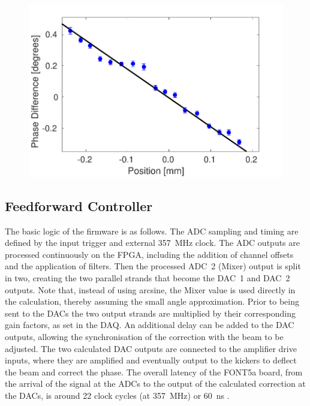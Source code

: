 \documentclass[%
 reprint,
 superscriptaddress,
 amsmath,
 amssymb,
 prstab,
]{revtex4-1}
\begin{document}

\begin{figure}
	\includegraphics[width=\columnwidth]{figs/hw/phMonHScan}%
	\caption{\label{f:phMonHScan}
	}
\end{figure}

\subsection{\label{ss:font}Feedforward Controller}

The basic logic of the firmware is as follows. The ADC sampling and timing are 
defined by the input trigger and external 357~MHz clock. The ADC outputs are 
processed continuously on the FPGA, including the addition of channel offsets 
and the application of filters. Then the processed ADC~2 (Mixer) output is 
split in two, creating the two parallel strands that become the DAC~1 and DAC~2 
outputs. Note that, instead of using arcsine, the Mixer value is used directly 
in the calculation, thereby assuming the small angle approximation. 
Prior to being sent to the DACs the two output strands are 
multiplied by their corresponding gain factors, as set in the DAQ. An 
additional delay can be added to the DAC outputs, allowing the synchronisation 
of the correction with the beam to be adjusted. The two calculated DAC outputs 
are connected to the amplifier drive inputs, where they are amplified and 
eventually output to the kickers to deflect the beam and correct the phase. 
The overall latency of the FONT5a board, from the arrival of the signal at the 
ADCs to the output of the calculated correction at the DACs, is around 22 clock 
cycles (at 357~MHz) or 60~ns \cite{glennCLIC14}.
\end{document}
